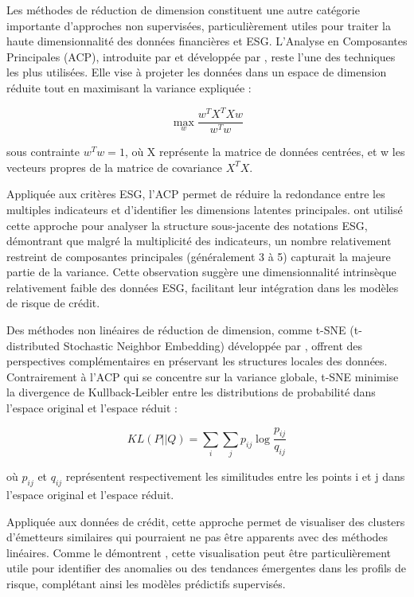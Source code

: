 Les méthodes de réduction de dimension constituent une autre catégorie importante d'approches non supervisées, particulièrement utiles pour traiter la haute dimensionnalité des données financières et ESG. L'Analyse en Composantes Principales (ACP), introduite par \citet{pearson1901} et développée par \citet{hotelling1933}, reste l'une des techniques les plus utilisées. Elle vise à projeter les données dans un espace de dimension réduite tout en maximisant la variance expliquée :

\begin{equation}
\max_{w} \frac{w^T X^T X w}{w^T w}
\end{equation}

sous contrainte $w^T w = 1$, où X représente la matrice de données centrées, et w les vecteurs propres de la matrice de covariance $X^T X$.

Appliquée aux critères ESG, l'ACP permet de réduire la redondance entre les multiples indicateurs et d'identifier les dimensions latentes principales. \citet{dorfleitner2018} ont utilisé cette approche pour analyser la structure sous-jacente des notations ESG, démontrant que malgré la multiplicité des indicateurs, un nombre relativement restreint de composantes principales (généralement 3 à 5) capturait la majeure partie de la variance. Cette observation suggère une dimensionnalité intrinsèque relativement faible des données ESG, facilitant leur intégration dans les modèles de risque de crédit.

Des méthodes non linéaires de réduction de dimension, comme t-SNE (t-distributed Stochastic Neighbor Embedding) développée par \citet{vandermaaten2008}, offrent des perspectives complémentaires en préservant les structures locales des données. Contrairement à l'ACP qui se concentre sur la variance globale, t-SNE minimise la divergence de Kullback-Leibler entre les distributions de probabilité dans l'espace original et l'espace réduit :

\begin{equation}
KL(P || Q) = \sum_i \sum_j p_{ij} \log \frac{p_{ij}}{q_{ij}}
\end{equation}

où $p_{ij}$ et $q_{ij}$ représentent respectivement les similitudes entre les points i et j dans l'espace original et l'espace réduit.

Appliquée aux données de crédit, cette approche permet de visualiser des clusters d'émetteurs similaires qui pourraient ne pas être apparents avec des méthodes linéaires. Comme le démontrent \citet{greco2019}, cette visualisation peut être particulièrement utile pour identifier des anomalies ou des tendances émergentes dans les profils de risque, complétant ainsi les modèles prédictifs supervisés.

